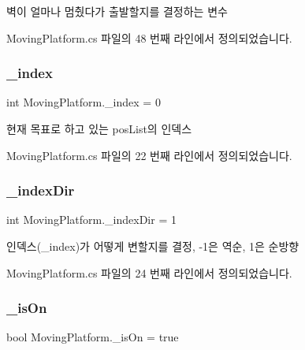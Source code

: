 벽이 얼마나 멈췄다가 출발할지를 결정하는 변수 



Moving\+Platform.\+cs 파일의 48 번째 라인에서 정의되었습니다.

\mbox{\label{class_moving_platform_a20948e50a50c338c4e62f84a633868ac}} 
\subsubsection{\texorpdfstring{\_index}{\_index}}
{\footnotesize\ttfamily int Moving\+Platform.\+\_\+index = 0\hspace{0.3cm}{\ttfamily [protected]}}



현재 목표로 하고 있는 pos\+List의 인덱스 



Moving\+Platform.\+cs 파일의 22 번째 라인에서 정의되었습니다.

\mbox{\label{class_moving_platform_a885973335ac91f8c34289d38f2d88d93}} 
\subsubsection{\texorpdfstring{\_indexDir}{\_indexDir}}
{\footnotesize\ttfamily int Moving\+Platform.\+\_\+index\+Dir = 1\hspace{0.3cm}{\ttfamily [private]}}



인덱스(\+\_\+index)가 어떻게 변할지를 결정, -\/1은 역순, 1은 순방향 



Moving\+Platform.\+cs 파일의 24 번째 라인에서 정의되었습니다.

\mbox{\label{class_moving_platform_a6721f91607e56294fb807a00ccfaafad}} 
\subsubsection{\texorpdfstring{\_isOn}{\_isOn}}
{\footnotesize\ttfamily bool Moving\+Platform.\+\_\+is\+On = true\hspace{0.3cm}{\ttfamily [private]}}

